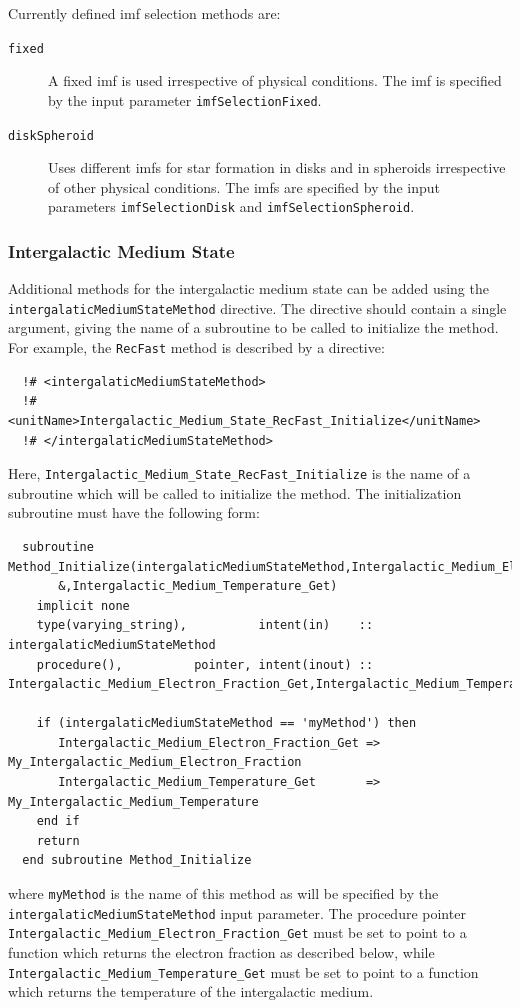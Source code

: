 Currently defined \gls{imf} selection methods are:
\begin{description}
 \item [{\tt fixed}] A fixed \gls{imf} is used irrespective of physical conditions. The \gls{imf} is specified by the input parameter {\tt imfSelectionFixed}.
 \item [{\tt diskSpheroid}] Uses different {\gls{imf}}s for star formation in disks and in spheroids irrespective of other physical conditions. The {\gls{imf}}s are specified by the input parameters {\tt imfSelectionDisk} and {\tt imfSelectionSpheroid}.
\end{description}

\subsubsection{Intergalactic Medium State}\label{sec:IntergalacticMediumStateMethods}

Additional methods for the intergalactic medium state can be added using the {\tt intergalaticMediumStateMethod} directive. The directive should contain a single argument, giving the name of a subroutine to be called to initialize the method. For example, the {\tt RecFast} method is described by a directive:
\begin{verbatim}
  !# <intergalaticMediumStateMethod>
  !#  <unitName>Intergalactic_Medium_State_RecFast_Initialize</unitName>
  !# </intergalaticMediumStateMethod>
\end{verbatim}
Here, {\tt Intergalactic\_Medium\_State\_RecFast\_Initialize} is the name of a subroutine which will be called to initialize the method. The initialization subroutine must have the following form:
\begin{verbatim}
  subroutine Method_Initialize(intergalaticMediumStateMethod,Intergalactic_Medium_Electron_Fraction_Get&
       &,Intergalactic_Medium_Temperature_Get)
    implicit none
    type(varying_string),          intent(in)    :: intergalaticMediumStateMethod
    procedure(),          pointer, intent(inout) :: Intergalactic_Medium_Electron_Fraction_Get,Intergalactic_Medium_Temperature_Get
    
    if (intergalaticMediumStateMethod == 'myMethod') then
       Intergalactic_Medium_Electron_Fraction_Get => My_Intergalactic_Medium_Electron_Fraction
       Intergalactic_Medium_Temperature_Get       => My_Intergalactic_Medium_Temperature
    end if
    return
  end subroutine Method_Initialize
\end{verbatim}
where {\tt myMethod} is the name of this method as will be specified by the {\tt intergalaticMediumStateMethod} input parameter. The procedure pointer {\tt Intergalactic\_Medium\_Electron\_Fraction\_Get} must be set to point to a function which returns the electron fraction as described below, while {\tt Intergalactic\_Medium\_Temperature\_Get} must be set to point to a function which returns the temperature of the intergalactic medium.

